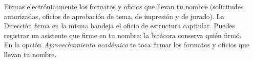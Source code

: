 \documentclass[11pt,a4paper]{article}
\begin{document}
{\small\tableofcontents}
\newpage
\begin{quevasahacer}
Firmas electrónicamente los formatos y oficios que llevan tu nombre (solicitudes autorizadas, oficios de aprobación de tema, de impresión y de jurado). La Dirección firma en la misma bandeja el oficio de estructura capitular. Puedes registrar un asistente que firme en tu nombre; la bitácora conserva quién firmó. En la opción \emph{Aprovechamiento académico} te toca firmar los formatos y oficios que llevan tu nombre.
\end{quevasahacer}



\end{document}

